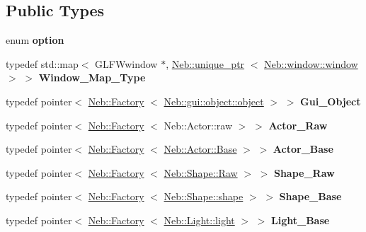 \subsection*{\-Public \-Types}
\begin{DoxyCompactItemize}
\item 
enum {\bfseries option} 
\item 
\hypertarget{classNeb_1_1master_aeb2db0ac51b05f774e11aa19b9d2ce86}{typedef std\-::map$<$ \-G\-L\-F\-Wwindow \*
$\ast$, \hyperlink{classNeb_1_1unique__ptr}{\-Neb\-::unique\-\_\-ptr}\*
$<$ \hyperlink{classNeb_1_1window_1_1window}{\-Neb\-::window\-::window} $>$ $>$ {\bfseries \-Window\-\_\-\-Map\-\_\-\-Type}}\label{classNeb_1_1master_aeb2db0ac51b05f774e11aa19b9d2ce86}

\item 
\hypertarget{classNeb_1_1master_a94b48133c9a795f4b5558ffb69ffd0fe}{typedef pointer$<$ \hyperlink{classNeb_1_1Factory}{\-Neb\-::\-Factory}\*
$<$ \hyperlink{classNeb_1_1gui_1_1object_1_1object}{\-Neb\-::gui\-::object\-::object} $>$ $>$ {\bfseries \-Gui\-\_\-\-Object}}\label{classNeb_1_1master_a94b48133c9a795f4b5558ffb69ffd0fe}

\item 
\hypertarget{classNeb_1_1master_a999616362a5b659e94d3483a300c3fd9}{typedef pointer$<$ \hyperlink{classNeb_1_1Factory}{\-Neb\-::\-Factory}\*
$<$ \-Neb\-::\-Actor\-::raw $>$ $>$ {\bfseries \-Actor\-\_\-\-Raw}}\label{classNeb_1_1master_a999616362a5b659e94d3483a300c3fd9}

\item 
\hypertarget{classNeb_1_1master_a9ee85d13c547fa1192c829c29af962e8}{typedef pointer$<$ \hyperlink{classNeb_1_1Factory}{\-Neb\-::\-Factory}\*
$<$ \hyperlink{classNeb_1_1Actor_1_1Base}{\-Neb\-::\-Actor\-::\-Base} $>$ $>$ {\bfseries \-Actor\-\_\-\-Base}}\label{classNeb_1_1master_a9ee85d13c547fa1192c829c29af962e8}

\item 
\hypertarget{classNeb_1_1master_a76f6512e054a485a88e51ce44c8cd40b}{typedef pointer$<$ \hyperlink{classNeb_1_1Factory}{\-Neb\-::\-Factory}\*
$<$ \hyperlink{classNeb_1_1Shape_1_1Raw}{\-Neb\-::\-Shape\-::\-Raw} $>$ $>$ {\bfseries \-Shape\-\_\-\-Raw}}\label{classNeb_1_1master_a76f6512e054a485a88e51ce44c8cd40b}

\item 
\hypertarget{classNeb_1_1master_abc736fe8bbbab8d795ad21c4ad1de933}{typedef pointer$<$ \hyperlink{classNeb_1_1Factory}{\-Neb\-::\-Factory}\*
$<$ \hyperlink{classNeb_1_1Shape_1_1shape}{\-Neb\-::\-Shape\-::shape} $>$ $>$ {\bfseries \-Shape\-\_\-\-Base}}\label{classNeb_1_1master_abc736fe8bbbab8d795ad21c4ad1de933}

\item 
\hypertarget{classNeb_1_1master_a9480a43957db151cab00534884ffdb7b}{typedef pointer$<$ \hyperlink{classNeb_1_1Factory}{\-Neb\-::\-Factory}\*
$<$ \hyperlink{classNeb_1_1Light_1_1light}{\-Neb\-::\-Light\-::light} $>$ $>$ {\bfseries \-Light\-\_\-\-Base}}\label{classNeb_1_1master_a9480a43957db151cab00534884ffdb7b}

\end{DoxyCompactItemize}
